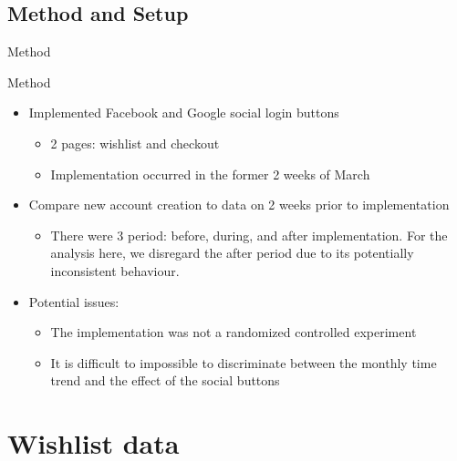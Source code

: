 \documentclass{beamer}
\begin{document}
	  \subsection{Method and Setup}
		\begin{frame}{Method}	
			\begin{block}{Method}
				\begin{itemize}
					\item Implemented Facebook and Google social login buttons
					\begin{itemize}
						\item 2 pages: wishlist and checkout
						\item Implementation occurred in the former 2 weeks of March
					\end{itemize}
					\item Compare new account creation to data on 2 weeks prior to implementation
						\begin{itemize}
							\item There were 3 period: before, during, and after implementation. For the analysis here, we disregard the after period due to its potentially inconsistent behaviour.
						\end{itemize}
					\item Potential issues:
					\begin{itemize}
						\item The implementation was not a randomized controlled experiment
						\item It is difficult to impossible to discriminate between the monthly time trend and the effect of the social buttons
					\end{itemize}
				\end{itemize}
			\end{block}	
		\end{frame}
		
		\section{Wishlist data}
\end{document}
